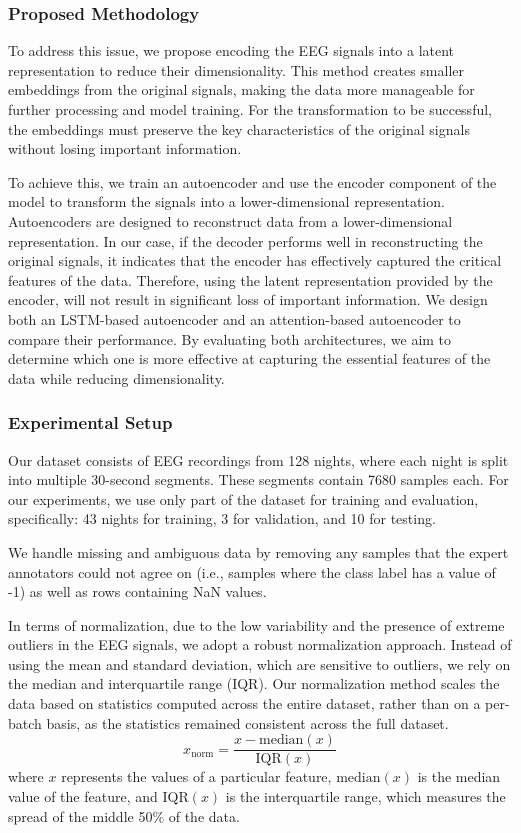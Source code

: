 \subsubsection{Proposed Methodology}

To address this issue, we propose encoding the EEG signals into a latent representation to reduce their dimensionality. This method creates smaller embeddings from the original signals, making the data more manageable for further processing and model training. For the transformation to be successful, the embeddings must preserve the key characteristics of the original signals without losing important information.

To achieve this, we train an autoencoder and use the encoder component of the model to transform the signals into a lower-dimensional representation. Autoencoders are designed to reconstruct data from a lower-dimensional representation. In our case, if the decoder performs well in reconstructing the original signals, it indicates that the encoder has effectively captured the critical features of the data. Therefore, using the latent representation provided by the encoder, will not result in significant loss of important information. We design both an LSTM-based autoencoder and an attention-based autoencoder to compare their performance. By evaluating both architectures, we aim to determine which one is more effective at capturing the essential features of the data while reducing dimensionality.

\subsubsection{Experimental Setup}


Our dataset consists of EEG recordings from 128 nights, where each night is split into multiple 30-second segments. These segments contain 7680 samples each. For our experiments, we use only part of the dataset for training and evaluation, specifically: 43 nights for training, 3 for validation, and 10 for testing.

We handle missing and ambiguous data by removing any samples that the expert annotators could not agree on (i.e., samples where the class label has a value of -1) as well as rows containing NaN values.

In terms of normalization, due to the low variability and the presence of extreme outliers in the EEG signals, we adopt a robust normalization approach. Instead of using the mean and standard deviation, which are sensitive to outliers, we rely on the median and interquartile range (IQR). Our normalization method scales the data based on statistics computed across the entire dataset, rather than on a per-batch basis, as the statistics remained consistent across the full dataset.
%
\begin{equation}
x_{\text{norm}} = \frac{x - \text{median}(x)}{\text{IQR}(x)} \label{eq:robust_norm}
\end{equation}
%
where $x$ represents the values of a particular feature, $\text{median}(x)$ is the median value of the feature, and $\text{IQR}(x)$ is the interquartile range, which measures the spread of the middle 50\% of the data.

